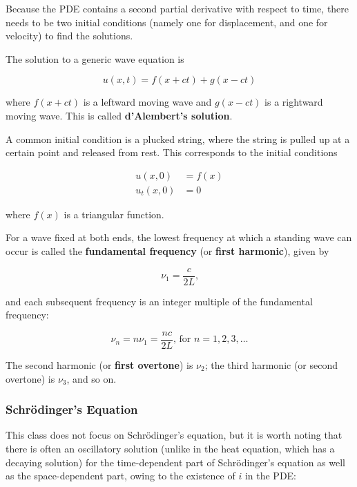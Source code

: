 Because the PDE contains a second partial derivative with respect to time, there needs to be two initial conditions (namely one for displacement, and one for velocity) to find the solutions.

\vsp

The solution to a generic wave equation is

\begin{equation*}
    u(x, t) = f(x + ct) + g(x - ct)
\end{equation*}

where $f(x + ct)$ is a leftward moving wave and $g(x - ct)$ is a rightward moving wave. This is called \textbf{d'Alembert's solution}.

\vsp

A common initial condition is a plucked string, where the string is pulled up at a certain point and released from rest. This corresponds to the initial conditions

\begin{align*}
    u(x, 0)   & = f(x) \\
    u_t(x, 0) & = 0
\end{align*}

where $f(x)$ is a triangular function.

\vsp

For a wave fixed at both ends, the lowest frequency at which a standing wave can occur is called the \textbf{fundamental frequency} (or \textbf{first harmonic}), given by

\begin{equation*}
    \nu_1 = \frac{c}{2L}\text{,}
\end{equation*}

and each subsequent frequency is an integer multiple of the fundamental frequency:

\begin{equation*}
    \nu_n = n\nu_1 = \frac{nc}{2L}\text{, for } n = 1, 2, 3, \dots
\end{equation*}

The second harmonic (or \textbf{first overtone}) is $\nu_2$; the third harmonic (or second overtone) is $\nu_3$, and so on.

\subsubsection{Schr\"odinger's Equation}

This class does not focus on Schr\"odinger's equation, but it is worth noting that there is often an oscillatory solution (unlike in the heat equation, which has a decaying solution) for the time-dependent part of Schr\"odinger's equation as well as the space-dependent part, owing to the existence of $i$ in the PDE:

